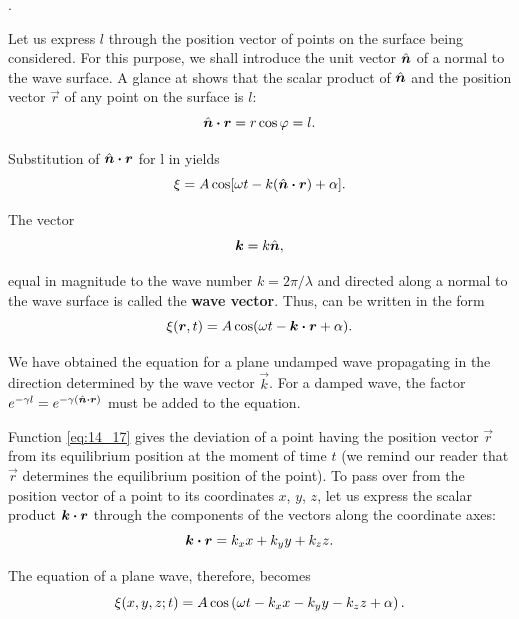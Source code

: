 \noindent
[$k = \omega/v$; see \eqn{14_9}].

Let us express $l$ through the position vector of points on the surface being considered.
For this purpose, we shall introduce the unit vector $\hat{\boldsymbol{n}}$ of a normal to the wave surface.
A glance at  shows that the scalar product of $\hat{\boldsymbol{n}}$ and the position vector $\vec{r}$ of any point on the surface is $l$:
\begin{equation*}
    \hat{\boldsymbol{n}} \boldsymbol{\cdot} \boldsymbol{r} = r\cos\varphi = l.
\end{equation*}

\noindent
Substitution of $\hat{\boldsymbol{n}}\boldsymbol{\cdot}\boldsymbol{r}$ for l in  yields
\begin{equation}\label{eq:14_15}
    \xi = A \cos[\omega t - k (\hat{\boldsymbol{n}}\boldsymbol{\cdot}\boldsymbol{r}) + \alpha].
\end{equation}

The vector
\begin{equation}\label{eq:14_16}
    \boldsymbol{k} = k \hat{\boldsymbol{n}},
\end{equation}

\noindent
equal in magnitude to the wave number $k=2\pi/\lambda$ and directed along a normal to the wave surface is called the \textbf{wave vector}.
Thus,  can be written in the form
\begin{equation}\label{eq:14_17}
    \xi(\boldsymbol{r},t) = A \cos(\omega t - \boldsymbol{k} \boldsymbol{\cdot} \boldsymbol{r} + \alpha).
\end{equation}

\noindent
We have obtained the equation for a plane undamped wave propagating in the direction determined by the wave vector $\vec{k}$.
For a damped wave, the factor $e^{-\gamma l}=e^{-\gamma (\hat{\boldsymbol{n}}\boldsymbol{\cdot}\boldsymbol{r})}$ must be added to the equation.

Function \eqref{eq:14_17} gives the deviation of a point having the position vector $\vec{r}$ from its equilibrium position at the moment of time $t$ (we remind our reader that $\vec{r}$ determines the equilibrium position of the point).
To pass over from the position vector of a point to its coordinates $x$, $y$, $z$, let us express the scalar product $\boldsymbol{k}\boldsymbol{\cdot}\boldsymbol{r}$ through the components of the vectors along the coordinate axes:
\begin{equation*}
    \boldsymbol{k}\boldsymbol{\cdot}\boldsymbol{r} = k_x x + k_y y + k_z z.
\end{equation*}

\noindent
The equation of a plane wave, therefore, becomes
\begin{equation}\label{eq:14_18}
    \xi(x,y,z; t) = A \cos\left( \omega t - k_x x - k_y y - k_z z + \alpha\right).
\end{equation}

